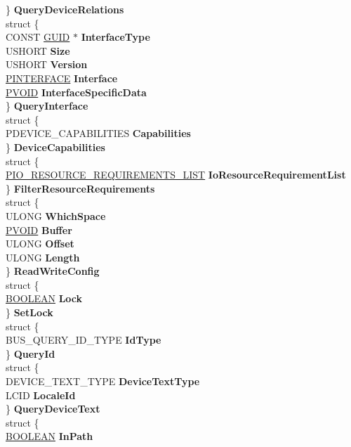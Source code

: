 \begin{DoxyCompactItemize}
\begin{tabbing}
\>\} {\bfseries QueryDeviceRelations}\\
\>struct \{\\
\>\>CONST \hyperlink{interface_g_u_i_d}{GUID} $\ast$ {\bfseries InterfaceType}\\
\>\>USHORT {\bfseries Size}\\
\>\>USHORT {\bfseries Version}\\
\>\>\hyperlink{struct___i_n_t_e_r_f_a_c_e}{PINTERFACE} {\bfseries Interface}\\
\>\>\hyperlink{interfacevoid}{PVOID} {\bfseries InterfaceSpecificData}\\
\>\} {\bfseries QueryInterface}\\
\>struct \{\\
\>\>PDEVICE\_CAPABILITIES {\bfseries Capabilities}\\
\>\} {\bfseries DeviceCapabilities}\\
\>struct \{\\
\>\>\hyperlink{struct___i_o___r_e_s_o_u_r_c_e___r_e_q_u_i_r_e_m_e_n_t_s___l_i_s_t}{PIO\_RESOURCE\_REQUIREMENTS\_LIST} {\bfseries IoResourceRequirementList}\\
\>\} {\bfseries FilterResourceRequirements}\\
\>struct \{\\
\>\>ULONG {\bfseries WhichSpace}\\
\>\>\hyperlink{interfacevoid}{PVOID} {\bfseries Buffer}\\
\>\>ULONG {\bfseries Offset}\\
\>\>ULONG {\bfseries Length}\\
\>\} {\bfseries ReadWriteConfig}\\
\>struct \{\\
\>\>\hyperlink{_processor_bind_8h_a112e3146cb38b6ee95e64d85842e380a}{BOOLEAN} {\bfseries Lock}\\
\>\} {\bfseries SetLock}\\
\>struct \{\\
\>\>BUS\_QUERY\_ID\_TYPE {\bfseries IdType}\\
\>\} {\bfseries QueryId}\\
\>struct \{\\
\>\>DEVICE\_TEXT\_TYPE {\bfseries DeviceTextType}\\
\>\>LCID {\bfseries LocaleId}\\
\>\} {\bfseries QueryDeviceText}\\
\>struct \{\\
\>\>\hyperlink{_processor_bind_8h_a112e3146cb38b6ee95e64d85842e380a}{BOOLEAN} {\bfseries InPath}\\

\end{tabbing}
\end{DoxyCompactItemize}
